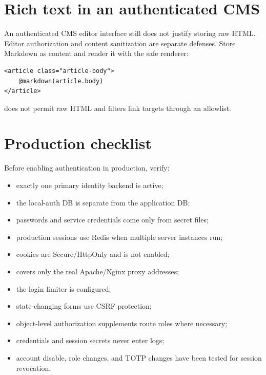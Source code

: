 \section{Rich text in an authenticated CMS}

An authenticated CMS editor interface still does not justify storing raw HTML. Editor authorization and content sanitization are separate defenses. Store Markdown as content and render it with the safe renderer:

\begin{lstlisting}[language=RWLang]
<article class="article-body">
    @markdown(article.body)
</article>
\end{lstlisting}

 does not permit raw HTML and filters link targets through an allowlist.

\section{Production checklist}

Before enabling authentication in production, verify:

\begin{itemize}
  \item exactly one primary identity backend is active;
  \item the local-auth DB is separate from the application DB;
  \item passwords and service credentials come only from secret files;
  \item production sessions use Redis when multiple server instances run;
  \item cookies are Secure/HttpOnly and  is not enabled;
  \item {} covers only the real Apache/Nginx proxy addresses;
  \item the login limiter is configured;
  \item state-changing forms use CSRF protection;
  \item object-level authorization supplements route roles where necessary;
  \item credentials and session secrets never enter logs;
  \item account disable, role changes, and TOTP changes have been tested for session revocation.
\end{itemize}

